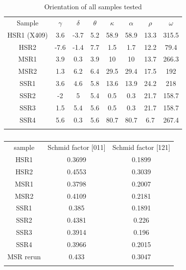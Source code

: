 \documentclass[a4paper,12pt,times,numbered,print,index]{Classes/PhDThesisPSnPDF}
\begin{document}
\begin{appendix}

\begin{table}[htbp]
\centering
	\caption{Orientation of all samples tested}
    \begin{tabular}{c c c c c c c c}
Sample & $\gamma$ & $\delta$ & $\theta$ & $\kappa$ & $\alpha$ & $\rho$ & $\omega$ \\
HSR1 (X409)& 3.6 & -3.7 & 5.2 & 58.9 & 58.9 & 13.3 & 315.5\\
HSR2 & -7.6 & -1.4 & 7.7 & 1.5 & 1.7 & 12.2 & 79.4\\
MSR1 & 3.9 & 0.3 & 3.9 & 10 & 10 & 13.7 & 266.3\\
MSR2 & 1.3 & 6.2 & 6.4 & 29.5 & 29.4 & 17.5 & 192\\
SSR1 & 3.6 & 4.6 & 5.8 & 13.6 & 13.9 & 24.2 & 218\\
SSR2 &-2 & 5 & 5.4 & 0.5 & 0.3 & 21.7 & 158.7\\
SSR3 & 1.5 & 5.4 & 5.6 & 0.5 & 0.3 & 21.7 & 158.7\\
SSR4 & 5.6 & 0.3 & 5.6 & 80.7 & 80.7 & 6.7 & 267.4\\
\label{tab:orient}
\end{tabular}
\end{table}

\begin{table}
\centering
\caption{}
\begin{tabular}{c c c}
sample & Schmid factor [011] & Schmid factor [121]\\
HSR1 & 0.3699 & 0.1899\\
HSR2 & 0.4553 & 0.3039\\
MSR1 & 0.3798 & 0.2007\\
MSR2 & 0.4109 & 0.2181\\
SSR1 & 0.385 & 0.1891\\
SSR2 & 0.4381 & 0.226\\
SSR3 & 0.3914 & 0.196\\
SSR4 & 0.3966 & 0.2015\\
MSR rerun & 0.433 & 0.3047\\
\label{tab:sS}
\end{tabular}
\end{table}

\end{appendix}
\end{document}
